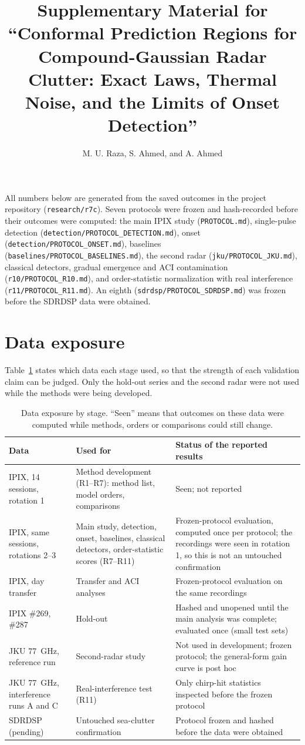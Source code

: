 \documentclass[10pt]{article}
\title{Supplementary Material for ``Conformal Prediction Regions for Compound-Gaussian Radar Clutter: Exact Laws, Thermal Noise, and the Limits of Onset Detection''}
\author{M. U. Raza, S. Ahmed, and A. Ahmed}
\date{}
\begin{document}
\maketitle
\noindent All numbers below are generated from the saved outcomes in the project repository (\texttt{research/r7c}). Seven protocols were frozen and hash-recorded before their outcomes were computed: the main IPIX study (\texttt{PROTOCOL.md}), single-pulse detection (\texttt{detection/PROTOCOL\_DETECTION.md}), onset (\texttt{detection/PROTOCOL\_ONSET.md}), baselines (\texttt{baselines/PROTOCOL\_BASELINES.md}), the second radar (\texttt{jku/PROTOCOL\_JKU.md}), classical detectors, gradual emergence and ACI contamination (\texttt{r10/PROTOCOL\_R10.md}), and order-statistic normalization with real interference (\texttt{r11/PROTOCOL\_R11.md}). An eighth (\texttt{sdrdsp/PROTOCOL\_SDRDSP.md}) was frozen before the SDRDSP data were obtained.

\section{Data exposure}
Table~\ref{tab:exposure} states which data each stage used, so that the strength of each validation claim can be judged. Only the hold-out series and the second radar were not used while the methods were being developed.
\begin{table}[h]
\centering\small
\caption{Data exposure by stage. ``Seen'' means that outcomes on these data were computed while methods, orders or comparisons could still change.}
\label{tab:exposure}
\begin{tabular}{p{4.3cm}p{5.2cm}p{6.2cm}}
\toprule
Data & Used for & Status of the reported results\\
\midrule
IPIX, 14 sessions, rotation 1 & Method development (R1--R7): method list, model orders, comparisons & Seen; not reported\\
IPIX, same sessions, rotations 2--3 & Main study, detection, onset, baselines, classical detectors, order-statistic scores (R7--R11) & Frozen-protocol evaluation, computed once per protocol; the recordings were seen in rotation 1, so this is not an untouched confirmation\\
IPIX, day transfer & Transfer and ACI analyses & Frozen-protocol evaluation on the same recordings\\
IPIX \#269, \#287 & Hold-out & Hashed and unopened until the main analysis was complete; evaluated once (small test sets)\\
JKU 77~GHz, reference run & Second-radar study & Not used in development; frozen protocol; the general-form gain curve is post hoc\\
JKU 77~GHz, interference runs A and C & Real-interference test (R11) & Only chirp-hit statistics inspected before the frozen protocol\\
SDRDSP (pending) & Untouched sea-clutter confirmation & Protocol frozen and hashed before the data were obtained\\
\bottomrule
\end{tabular}
\end{table}
\end{document}
